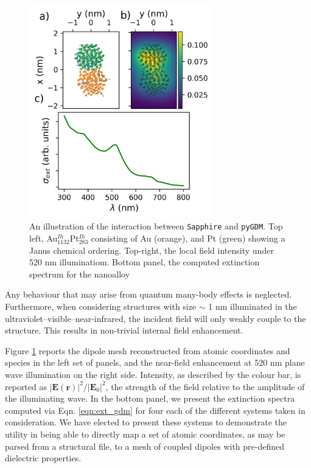 \begin{figure}[ht!]
    \centering
    \includegraphics[width=8cm]{figures/Sapphire/Faraday_Light.jpeg}
    \caption{An illustration of the interaction between \texttt{Sapphire} and \texttt{pyGDM}. Top left, Au$_{1132}^{Ih}$Pt$_{283}^{Ih}$ consisting of Au (orange), and Pt (green) showing a Janus chemical ordering. Top-right, the local field intensity under 520 nm illuminatiom. Bottom panel, the computed extinction spectrum for the nanoalloy}
    \label{fig:light}
\end{figure}

Any behaviour that may arise from quantum many-body effects is neglected.
Furthermore, when considering structures with size $\sim$ 1 nm illuminated in the ultraviolet–visible–near-infrared, the incident field will only weakly couple to the structure. 
This results in non-trivial internal field enhancement.

Figure \ref{fig:light} reports the dipole mesh reconstructed from atomic coordinates and species in the left set of panels, and the near-field enhancement at 520 nm plane wave illumination on the right side. Intensity, as described by the colour bar, is reported as $|\mathbf{E}\left(\mathbf{r}\right)|^{2}/|\mathbf{E}_{0}|^{2}$, the strength of the field relative to the amplitude of the illuminating wave.
In the bottom panel, we present the extinction spectra computed via Eqn. \ref{eqn:ext_gdm} for four each of the different systems taken in consideration.
%
We have elected to present these systems to demonstrate the utility in being able to directly map a set of atomic coordinates, as may be parsed from a structural file, to a mesh of coupled dipoles with pre-defined dielectric properties. 

